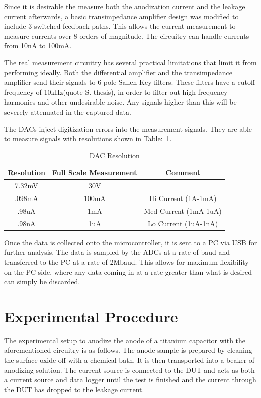 \documentclass[journal]{IEEEtran}
\begin{document}
Since it is desirable the measure both the anodization current and the leakage current afterwards, a basic transimpedance amplifier design was modified to include 3 switched feedback paths. This allows the current measurement to measure currents over 8 orders of magnitude. The circuitry can handle currents from 10nA to 100mA.

The real measurement circuitry has several practical limitations that limit it from performing ideally. Both the differential amplifier and the transimpedance amplifier send their signals to 6-pole Sallen-Key filters. These filters have a cutoff frequency of 10kHz(quote S. thesis), in order to filter out high frequency harmonics and other undesirable noise. Any signals higher than this will be severely attenuated in the captured data.

The DACs inject digitization errors into the measurement signals. They are able to measure signals with resolutions shown in Table:~\ref{tab:dacRes}.


\begin{table}[here]
\renewcommand{\arraystretch}{1.3}
\caption{DAC Resolution}
\label{tab:dacRes}
\centering
\begin{tabular}{c||c||c}
\hline
\bfseries Resolution & \bfseries Full Scale Measurement & \bfseries Comment\\
\hline\hline
7.32mV & 30V & \\
\hline\hline
.098mA & 100mA & Hi Current (1A-1mA)\\
\hline\hline
.98uA & 1mA & Med Current (1mA-1uA) \\
\hline\hline
.98nA & 1uA & Lo Current (1uA-1nA)\\
\hline
\end{tabular}
\end{table}

Once the data is collected onto the microcontroller, it is sent to a PC via USB for further analysis. The data is sampled by the ADCs at a rate of baud and transferred to the PC at a rate of 2Mbaud. This allows for maximum flexibility on the PC side, where any data coming in at a rate greater than what is desired can simply be discarded.

\section{Experimental Procedure}
The experimental setup to anodize the anode of a titanium capacitor with the aforementioned circuitry is as follows. The anode sample is prepared by cleaning the surface oxide off with a chemical bath. It is then transported into a beaker of anodizing solution. The current source is connected to the DUT and acts as both a current source and data logger until the test is finished and the current through the DUT has dropped to the leakage current.
\end{document}
